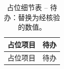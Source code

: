 \begin{table}[t]
  \centering
  \caption{占位细节表 -- 待办：替换为经核验的数值。}
  \label{tab:placeholder-detail}
  \begin{tabular}{lc}
    \hline
    占位项目 & 待办 \\
    \hline
    占位项目 & 待办 \\
    \hline
  \end{tabular}
\end{table}
